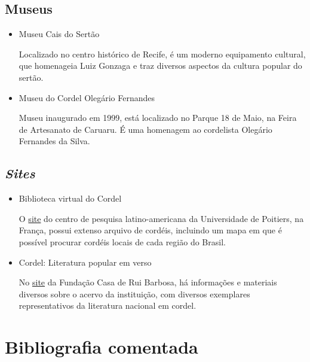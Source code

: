 \documentclass[12pt]{extarticle}
\begin{document}
\subsection{Museus}

\begin{itemize}

\item Museu Cais do Sertão

Localizado no centro histórico de Recife, é um moderno equipamento cultural,
que homenageia Luiz Gonzaga e traz diversos aspectos da cultura popular do
sertão.

\item Museu do Cordel Olegário Fernandes

Museu inaugurado em 1999, está localizado no Parque 18 de Maio, na Feira de
Artesanato de Caruaru. É uma homenagem ao cordelista Olegário Fernandes da
Silva.

\end{itemize}

\subsection{\emph{Sites}}

\begin{itemize}

\item Biblioteca virtual do Cordel

O \href{http://cordel.edel.univ-poitiers.fr}{site} do centro de pesquisa
latino-americana da Universidade de Poitiers, na França, possui extenso arquivo
de cordéis, incluindo um mapa em que é possível procurar cordéis locais de cada
região do Brasil.

\item Cordel: Literatura popular em verso

No \href{http://www.casaruibarbosa.gov.br/cordel/acervo.html}{site} da Fundação
Casa de Rui Barbosa, há informações e materiais diversos sobre o acervo da
instituição, com diversos exemplares representativos da literatura nacional em
cordel.
\end{itemize}

\section{Bibliografia comentada}
\end{document}
